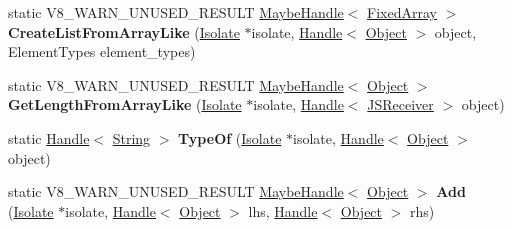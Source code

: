 \begin{DoxyCompactItemize}
\item 
\mbox{\label{classv8_1_1internal_1_1Object_a5801600bdacd06963cf92d99834efe26}} 
static V8\+\_\+\+W\+A\+R\+N\+\_\+\+U\+N\+U\+S\+E\+D\+\_\+\+R\+E\+S\+U\+LT \mbox{\hyperlink{classv8_1_1internal_1_1MaybeHandle}{Maybe\+Handle}}$<$ \mbox{\hyperlink{classv8_1_1internal_1_1FixedArray}{Fixed\+Array}} $>$ {\bfseries Create\+List\+From\+Array\+Like} (\mbox{\hyperlink{classv8_1_1internal_1_1Isolate}{Isolate}} $\ast$isolate, \mbox{\hyperlink{classv8_1_1internal_1_1Handle}{Handle}}$<$ \mbox{\hyperlink{classv8_1_1internal_1_1Object}{Object}} $>$ object, Element\+Types element\+\_\+types)
\item 
\mbox{\label{classv8_1_1internal_1_1Object_ad7f04dd8a9c952fcf3b04e31a599c117}} 
static V8\+\_\+\+W\+A\+R\+N\+\_\+\+U\+N\+U\+S\+E\+D\+\_\+\+R\+E\+S\+U\+LT \mbox{\hyperlink{classv8_1_1internal_1_1MaybeHandle}{Maybe\+Handle}}$<$ \mbox{\hyperlink{classv8_1_1internal_1_1Object}{Object}} $>$ {\bfseries Get\+Length\+From\+Array\+Like} (\mbox{\hyperlink{classv8_1_1internal_1_1Isolate}{Isolate}} $\ast$isolate, \mbox{\hyperlink{classv8_1_1internal_1_1Handle}{Handle}}$<$ \mbox{\hyperlink{classv8_1_1internal_1_1JSReceiver}{J\+S\+Receiver}} $>$ object)
\item 
\mbox{\label{classv8_1_1internal_1_1Object_a80249ff76418f39d8d5292216fb4f4b9}} 
static \mbox{\hyperlink{classv8_1_1internal_1_1Handle}{Handle}}$<$ \mbox{\hyperlink{classv8_1_1internal_1_1String}{String}} $>$ {\bfseries Type\+Of} (\mbox{\hyperlink{classv8_1_1internal_1_1Isolate}{Isolate}} $\ast$isolate, \mbox{\hyperlink{classv8_1_1internal_1_1Handle}{Handle}}$<$ \mbox{\hyperlink{classv8_1_1internal_1_1Object}{Object}} $>$ object)
\item 
\mbox{\label{classv8_1_1internal_1_1Object_a5c4c8f0501f53a081a88755ebc4c1854}} 
static V8\+\_\+\+W\+A\+R\+N\+\_\+\+U\+N\+U\+S\+E\+D\+\_\+\+R\+E\+S\+U\+LT \mbox{\hyperlink{classv8_1_1internal_1_1MaybeHandle}{Maybe\+Handle}}$<$ \mbox{\hyperlink{classv8_1_1internal_1_1Object}{Object}} $>$ {\bfseries Add} (\mbox{\hyperlink{classv8_1_1internal_1_1Isolate}{Isolate}} $\ast$isolate, \mbox{\hyperlink{classv8_1_1internal_1_1Handle}{Handle}}$<$ \mbox{\hyperlink{classv8_1_1internal_1_1Object}{Object}} $>$ lhs, \mbox{\hyperlink{classv8_1_1internal_1_1Handle}{Handle}}$<$ \mbox{\hyperlink{classv8_1_1internal_1_1Object}{Object}} $>$ rhs)

\end{DoxyCompactItemize}
